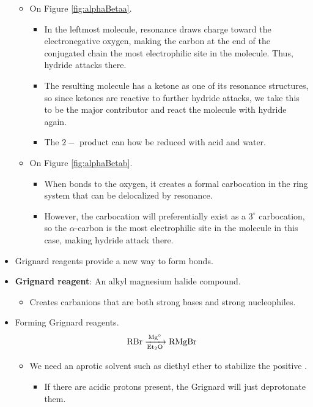 \documentclass[../notes.tex]{subfiles}
\begin{document}
\begin{itemize}
\begin{itemize}
        \item On Figure \ref{fig:alphaBetaa}.
        \begin{itemize}
            \item In the leftmost molecule, resonance draws charge toward the electronegative oxygen, making the carbon at the end of the conjugated chain the most electrophilic site in the molecule. Thus, hydride attacks there.
            \item The resulting molecule has a ketone as one of its resonance structures, so since ketones are reactive to further hydride attacks, we take this to be the major contributor and react the molecule with hydride again.
            \item The $2-$ product can how be reduced with acid and water.
        \end{itemize}
        \item On Figure \ref{fig:alphaBetab}.
        \begin{itemize}
            \item When  bonds to the oxygen, it creates a formal carbocation in the ring system that can be delocalized by resonance.
            \item However, the carbocation will preferentially exist as a $3^\circ$ carbocation, so the $\alpha$-carbon is the most electrophilic site in the molecule in this case, making hydride attack there.
        \end{itemize}
    \end{itemize}
    \item Grignard reagents provide a new way to form  bonds.
    \item \textbf{Grignard reagent}: An alkyl magnesium halide compound.
    \begin{itemize}
        \item Creates carbanions that are both strong bases and strong nucleophiles.
    \end{itemize}
    \item Forming Grignard reagents.
    \begin{equation*}
        \ce{RBr ->[Mg^\circ][Et2O] RMgBr}
    \end{equation*}
    \begin{itemize}
        \item We need an aprotic solvent such as diethyl ether to stabilize the positive .
        \begin{itemize}
            \item If there are acidic protons present, the Grignard will just deprotonate them.

\end{itemize}
\end{itemize}
\end{itemize}
\end{document}

